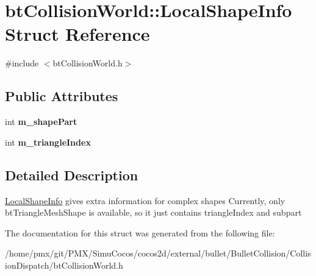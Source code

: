 \hypertarget{structbtCollisionWorld_1_1LocalShapeInfo}{}\section{bt\+Collision\+World\+:\+:Local\+Shape\+Info Struct Reference}
\label{structbtCollisionWorld_1_1LocalShapeInfo}


{\ttfamily \#include $<$bt\+Collision\+World.\+h$>$}

\subsection*{Public Attributes}
\begin{DoxyCompactItemize}
\item 
\mbox{\label{structbtCollisionWorld_1_1LocalShapeInfo_a3390c8534d107c52651b93180d6284d9}} 
int {\bfseries m\+\_\+shape\+Part}
\item 
\mbox{\label{structbtCollisionWorld_1_1LocalShapeInfo_a2099265fc930533423ee8ef1af10d09e}} 
int {\bfseries m\+\_\+triangle\+Index}
\end{DoxyCompactItemize}


\subsection{Detailed Description}
\hyperlink{structbtCollisionWorld_1_1LocalShapeInfo}{Local\+Shape\+Info} gives extra information for complex shapes Currently, only bt\+Triangle\+Mesh\+Shape is available, so it just contains triangle\+Index and subpart 

The documentation for this struct was generated from the following file\+:\begin{DoxyCompactItemize}
\item 
/home/pmx/git/\+P\+M\+X/\+Simu\+Cocos/cocos2d/external/bullet/\+Bullet\+Collision/\+Collision\+Dispatch/bt\+Collision\+World.\+h\end{DoxyCompactItemize}
